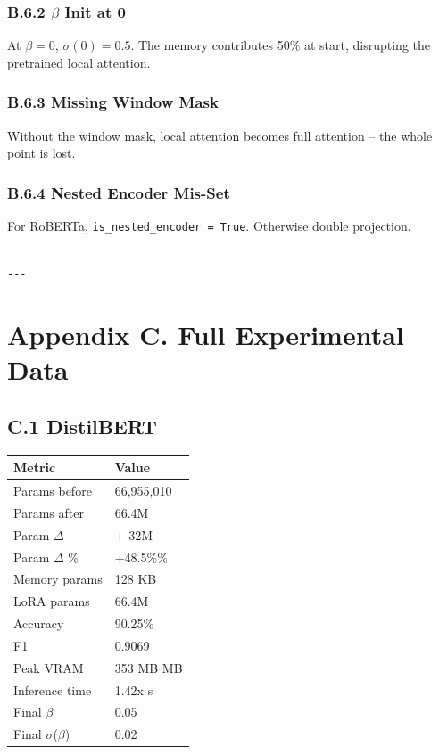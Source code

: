 \subsubsection{B.6.2 $\beta$ Init at 0}

At $\beta = 0$, $\sigma(0) = 0.5$. The memory contributes 50\% at start, 
disrupting the pretrained local attention.

\subsubsection{B.6.3 Missing Window Mask}

Without the window mask, local attention becomes full attention -- the 
whole point is lost.

\subsubsection{B.6.4 Nested Encoder Mis-Set}

For RoBERTa, \texttt{is\_nested\_encoder = True}. Otherwise double projection.
\begin{lstlisting}

---
\end{lstlisting}


\section{Appendix C. Full Experimental Data}

\subsection{C.1 DistilBERT}

\begin{table}[H]
\centering
\small
\begin{tabular}{ll}
\toprule
\textbf{Metric} & \textbf{Value} \\
\midrule
Params before & 66,955,010 \\
Params after & 66.4M \\
Param $\Delta$ & +-32M \\
Param $\Delta$ \% & +48.5\%\% \\
Memory params & 128 KB \\
LoRA params & 66.4M \\
Accuracy & 90.25\% \\
F1 & 0.9069 \\
Peak VRAM & 353 MB MB \\
Inference time & 1.42x s \\
Final $\beta$ & 0.05 \\
Final $\sigma$($\beta$) & 0.02 \\
\bottomrule
\end{tabular}
\end{table}

